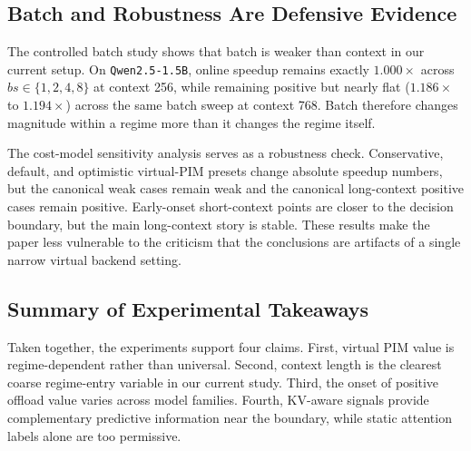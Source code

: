 \subsection{Batch and Robustness Are Defensive Evidence}

The controlled batch study shows that batch is weaker than context in our current setup. On \texttt{Qwen2.5-1.5B}, online speedup remains exactly $1.000\times$ across $bs \in \{1,2,4,8\}$ at context 256, while remaining positive but nearly flat ($1.186\times$ to $1.194\times$) across the same batch sweep at context 768. Batch therefore changes magnitude within a regime more than it changes the regime itself.

The cost-model sensitivity analysis serves as a robustness check. Conservative, default, and optimistic virtual-PIM presets change absolute speedup numbers, but the canonical weak cases remain weak and the canonical long-context positive cases remain positive. Early-onset short-context points are closer to the decision boundary, but the main long-context story is stable. These results make the paper less vulnerable to the criticism that the conclusions are artifacts of a single narrow virtual backend setting.

\subsection{Summary of Experimental Takeaways}

Taken together, the experiments support four claims. First, virtual PIM value is regime-dependent rather than universal. Second, context length is the clearest coarse regime-entry variable in our current study. Third, the onset of positive offload value varies across model families. Fourth, KV-aware signals provide complementary predictive information near the boundary, while static attention labels alone are too permissive.
